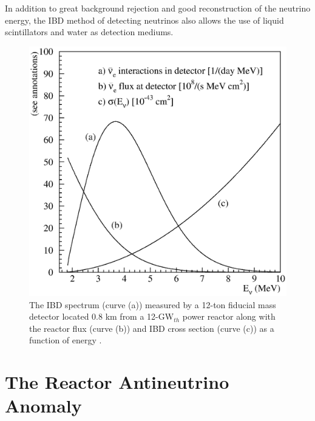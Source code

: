 In addition to great background rejection and good reconstruction of the neutrino energy, the IBD method of detecting neutrinos also allows the use of liquid scintillators and water as detection mediums. 

\begin{figure}[h]
	\centering
	\includegraphics[width=0.7\linewidth]{tex/3-reactorneutrinos-images/vogel-fig02}
	\caption{The IBD spectrum (curve (a)) measured by a 12-ton fiducial mass detector located 0.8 km from a 12-GW$_{th}$ power reactor along with the reactor flux (curve (b)) and IBD cross section (curve (c)) as a function of energy \cite{PDG}.}
	\label{fig:vogel-fig02}
\end{figure}




\section{The Reactor Antineutrino Anomaly}






